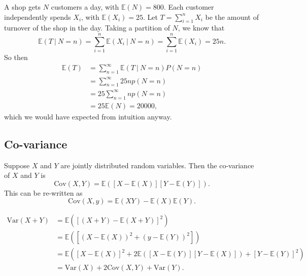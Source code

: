 \documentclass[letter-paper]{tufte-book}
\newenvironment{example}[1][Example]{\begin{trivlist}
\item[\hskip \labelsep {\bfseries #1}]}{\end{trivlist}}
\begin{document}
\begin{example}
  A shop gets $N$ customers a day, with $\mathbb{E}(N) = 800$. Each customer
  independently spends $X_i$, with $\mathbb{E}(X_i) = 25$. Let $T = \sum_{i=1}^n
  X_i$ be the amount of turnover of the shop in the day. Taking a partition of
  $N$, we know that
  \begin{equation*}
    \mathbb{E}(T\ |\ N=n) = \sum_{i=1}^n \mathbb{E}(X_i\ |\ N=n) =
    \sum_{i=1}^n \mathbb{E}(X_i) = 25n.
  \end{equation*}
  So then
  \begin{align*}
    \mathbb{E}(T) &= \sum_{n=1}^\infty \mathbb{E}(T\ |\ N=n) P(N=n) \\
      &= \sum_{n=1}^\infty 25n p(N=n) \\
      &= 25 \sum_{n=1}^\infty np(N=n) \\
      &= 25\mathbb{E}(N) = 20000,
  \end{align*}
  which we would have expected from intuition anyway.
\end{example}


\subsection{Co-variance}

Suppose $X$ and $Y$ are jointly distributed random variables. Then the
co-variance of $X$ and $Y$ is
\begin{equation*}
  \mbox{Cov}(X,Y) = \mathbb{E}([X - \mathbb{E}(X)][Y - \mathbb{E}(Y)]).
\end{equation*}
This can be re-written as
\begin{equation*}
  \mbox{Cov}(X,y) = \mathbb{E}(XY) - \mathbb{E}(X)\mathbb{E}(Y).
\end{equation*}

\begin{example}
  \begin{align*}
    \mbox{Var}(X+Y) 
      & = \mathbb{E}\left( [(X+Y) - \mathbb{E}(X+Y)]^2\right) \\
      & = \mathbb{E}\left([(X-\mathbb{E}(X))^2 + (y-\mathbb{E}(Y))^2]\right) \\
      & = \mathbb{E}\left( [X-\mathbb{E}(X)]^2 +
        2\mathbb{E}([X-\mathbb{E}(Y)][Y-\mathbb{E}(X)])
        +[Y-\mathbb{E}(Y)]^2\right)\\
      & = \mbox{Var}(X) + 2\mbox{Cov}(X,Y) + \mbox{Var}(Y).
  \end{align*}
\end{example}
\end{document}
